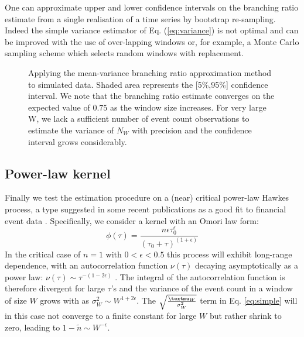 \documentclass{article}
\begin{document}
One can approximate upper and lower confidence intervals on the branching
ratio estimate from a single realisation of a time series by bootstrap
re-sampling. Indeed the simple variance estimator of Eq. (\ref{eq:variance})
is not optimal and can be improved with the use of over-lapping windows or,
for example, a Monte Carlo sampling scheme which selects random windows with
replacement.

\begin{figure}[h]
  \caption{\label{fig:varying} Applying the mean-variance branching ratio
  approximation method to simulated data. Shaded area represents the
  [5\%,95\%] confidence interval. We note that the branching ratio estimate
  converges on the expected value of $0.75$ as the window size increases. For
  very large W, we lack a sufficient number of event count observations to
  estimate the variance of $N_W$ with precision and the confidence interval
  grows considerably.}
\end{figure}

\subsection{Power-law kernel}

Finally we test the estimation procedure on a (near) critical power-law Hawkes
process, a type suggested in some recent publications as a good fit to
financial event data {\cite{bacry,criticalreflexivity}}. Specifically, we
consider a kernel with an Omori law form:
\[ \phi (\tau) = \frac{n \epsilon \tau_0^{\epsilon}}{(\tau_0 + \tau)^{(1 +
   \epsilon)}} \]
In the critical case of $n = 1$ with $0 < \epsilon < 0.5$ this process will
exhibit long-range dependence, with an autocorrelation function $\nu (\tau)$
decaying asymptotically as a power law: $\nu (\tau) \sim \tau^{- (1 - 2
\epsilon)}$ {\cite{bremaud,criticalreflexivity}}. The integral of the
autocorrelation function is therefore divergent for large $\tau$'s and the
variance of the event count in a window of size $W$ grows with as $\sigma^2_W
\sim W^{1 + 2 \epsilon}$. The $\sqrt{\frac{{\textmu}_W}{\sigma^2_W}}$ term in
Eq. \ref{eq:simple} will in this case not converge to a finite constant for
large $W$ but rather shrink to zero, leading to $1 - \tilde{n} \sim W^{-
\epsilon}$.
\end{document}
